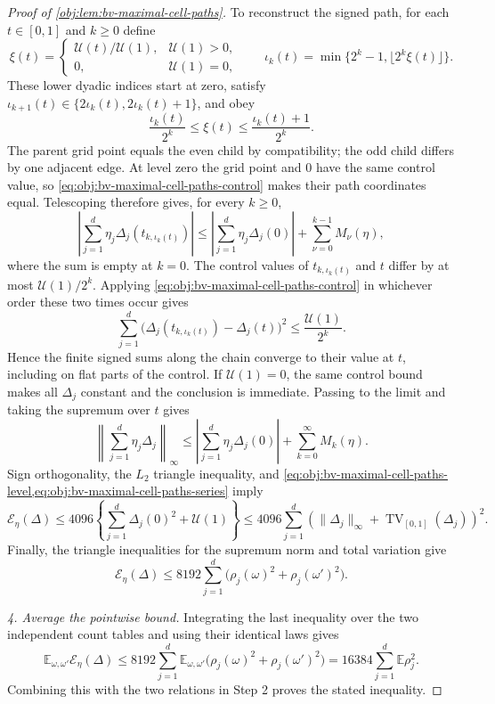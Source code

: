 \documentclass[11pt]{article}
\begin{document}
\begin{proof}[Proof of \cref{obj:lem:bv-maximal-cell-paths}]
To reconstruct the signed path, for each \(t\in[0,1]\) and
\(k\ge0\) define
\[
\xi(t)=
\begin{cases}
\mathcal U(t)/\mathcal U(1),&\mathcal U(1)>0,\\
0,&\mathcal U(1)=0,
\end{cases}
\qquad
\iota_k(t)=\min\{2^k-1,\lfloor2^k\xi(t)\rfloor\}.
\]
These lower dyadic indices start at zero, satisfy
\(\iota_{k+1}(t)\in\{2\iota_k(t),2\iota_k(t)+1\}\), and obey
\[
\frac{\iota_k(t)}{2^k}\le\xi(t)
\le\frac{\iota_k(t)+1}{2^k}.
\]
The parent grid point equals the even child by compatibility; the odd
child differs by one adjacent edge. At level zero the grid point and
\(0\) have the same control value, so \cref{eq:obj:bv-maximal-cell-paths-control}
makes their path coordinates equal. Telescoping therefore gives, for
every \(k\ge0\),
\[
\left|\sum_{j=1}^d\eta_j
 \Delta_j(t_{k,\iota_k(t)})\right|
\le
\left|\sum_{j=1}^d\eta_j\Delta_j(0)\right|
+\sum_{\nu=0}^{k-1}M_\nu(\eta),
\]
where the sum is empty at \(k=0\). The control values of
\(t_{k,\iota_k(t)}\) and \(t\) differ by at most
\(\mathcal U(1)/2^k\). Applying
\cref{eq:obj:bv-maximal-cell-paths-control} in whichever order these
two times occur gives
\[
\sum_{j=1}^d
 \bigl(\Delta_j(t_{k,\iota_k(t)})-\Delta_j(t)\bigr)^2
\le \frac{\mathcal U(1)}{2^k}.
\]
Hence the finite signed sums along the chain converge to their value
at \(t\), including on flat parts of the control. If
\(\mathcal U(1)=0\), the same control bound makes all \(\Delta_j\)
constant and the conclusion is immediate. Passing to the limit and
taking the supremum over \(t\) gives
\[
\left\|\sum_{j=1}^d\eta_j\Delta_j\right\|_\infty
\le
\left|\sum_{j=1}^d\eta_j\Delta_j(0)\right|
 +\sum_{k=0}^\infty M_k(\eta).
\]
Sign orthogonality, the \(L_2\) triangle inequality, and
\cref{eq:obj:bv-maximal-cell-paths-level,eq:obj:bv-maximal-cell-paths-series}
imply
\[
\mathcal E_\eta(\Delta)
\le
4096\left\{
 \sum_{j=1}^d\Delta_j(0)^2+\mathcal U(1)
\right\}
\le
4096\sum_{j=1}^d
 \left(\|\Delta_j\|_\infty+
 \operatorname{TV}_{[0,1]}(\Delta_j)\right)^2.
\]
Finally, the triangle inequalities for the supremum norm and total
variation give
\[
\mathcal E_\eta(\Delta)
\le
8192\sum_{j=1}^d
 \bigl(\rho_j(\omega)^2+\rho_j(\omega')^2\bigr).
\]

\noindent\textit{4. Average the pointwise bound.}
Integrating the last inequality over the two independent count tables
and using their identical laws gives
\[
\mathbb E_{\omega,\omega'}\mathcal E_\eta(\Delta)
\le
8192\sum_{j=1}^d
 \mathbb E_{\omega,\omega'}
 \bigl(\rho_j(\omega)^2+\rho_j(\omega')^2\bigr)
=
16384\sum_{j=1}^d\mathbb E\rho_j^2.
\]
Combining this with the two relations in Step 2 proves the stated
inequality. %
\end{proof}
\end{document}
